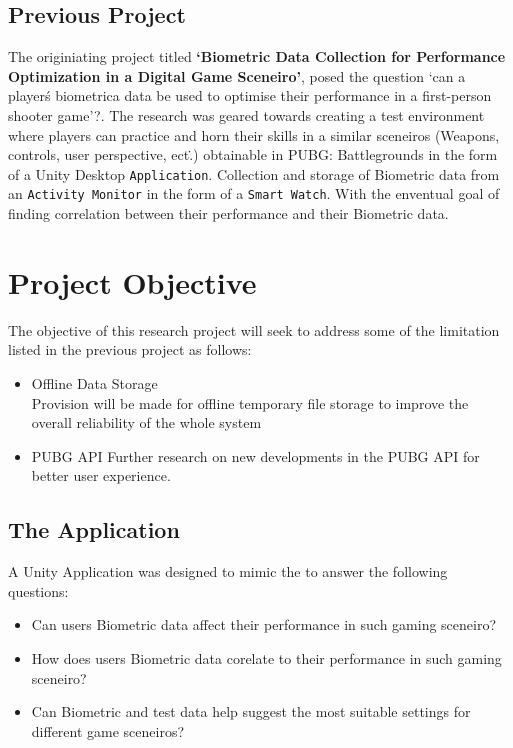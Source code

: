 \documentclass{report}
\begin{document}
    \subsection*{Previous Project}
    The originiating project titled \textbf{`Biometric Data Collection for Performance Optimization in a Digital
    Game Sceneiro'}, posed the question `can a player\'s biometrica data be used to optimise their performance in a 
    first-person shooter game'?. The research was geared towards creating a test environment where players can 
    practice and horn their skills in a similar sceneiros (Weapons, controls, user perspective, ect\..) obtainable in PUBG\:: 
    Battlegrounds in the form of a Unity Desktop {\tt Application}. Collection and storage of Biometric data from an 
    {\tt Activity Monitor} in the form of a {\tt Smart Watch}. With the enventual goal of finding correlation between their
    performance and their Biometric data. 

    \section*{Project Objective}
    The objective of this research project will seek to address some of the limitation listed in the previous project as 
    follows\::
    \begin{itemize}
        \item {Offline Data Storage}\\
        Provision will be made for offline temporary file storage to improve the overall reliability of the whole system
        \item{PUBG API}
        Further research on new developments in the PUBG API for better user experience. 
    \end{itemize} 
    
    \subsection*{The Application}
     
    A Unity Application was designed to mimic the 
    to answer the following questions: 
    \begin{itemize}
        \item {Can users Biometric data affect their performance in such gaming sceneiro?}
        \item {How does users Biometric data corelate to their performance in such gaming sceneiro?}
        \item {Can Biometric and test data help suggest the most suitable settings for different game sceneiros?}
    \end{itemize}
\end{document}
